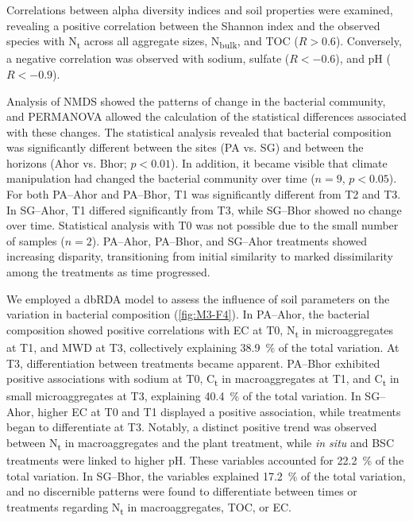 Correlations between alpha diversity indices and soil properties were examined, revealing a positive correlation between the Shannon index and the observed species with N\textsubscript{t} across all aggregate sizes, N\textsubscript{bulk}, and TOC (\(R > 0.6\)). Conversely, a negative correlation was observed with sodium, sulfate (\(R < -0.6\)), and pH (\(R < -0.9\)).

Analysis of NMDS showed the patterns of change in the bacterial community, and PERMANOVA allowed the calculation of the statistical differences associated with these changes. The statistical analysis revealed that bacterial composition was significantly different between the sites (PA vs. SG) and between the horizons (Ahor vs. Bhor; \(p < 0.01\)). In addition, it became visible that climate manipulation had changed the bacterial community over time (\(n=9\), \(p < 0.05\)). For both PA--Ahor and PA--Bhor, T1 was significantly different from T2 and T3. In SG--Ahor, T1 differed significantly from T3, while SG--Bhor showed no change over time. Statistical analysis with T0 was not possible due to the small number of samples (\(n=2\)). PA--Ahor, PA--Bhor, and SG--Ahor treatments showed increasing disparity, transitioning from initial similarity to marked dissimilarity among the treatments as time progressed.

We employed a dbRDA model to assess the influence of soil parameters on the variation in bacterial composition (\ref{fig:M3-F4}). In PA--Ahor, the bacterial composition showed positive correlations with EC at T0, N\textsubscript{t} in microaggregates at T1, and MWD at T3, collectively explaining \SI{38.9}{\percent} of the total variation. At T3, differentiation between treatments became apparent. PA--Bhor exhibited positive associations with sodium at T0, C\textsubscript{t} in macroaggregates at T1, and C\textsubscript{t} in small microaggregates at T3, explaining \SI{40.4}{\percent} of the total variation. In SG--Ahor, higher EC at T0 and T1 displayed a positive association, while treatments began to differentiate at T3. Notably, a distinct positive trend was observed between N\textsubscript{t} in macroaggregates and the plant treatment, while \textit{in situ} and BSC treatments were linked to higher pH. These variables accounted for \SI{22.2}{\percent} of the total variation. In SG--Bhor, the variables explained \SI{17.2}{\percent} of the total variation, and no discernible patterns were found to differentiate between times or treatments regarding N\textsubscript{t} in macroaggregates, TOC, or EC.

